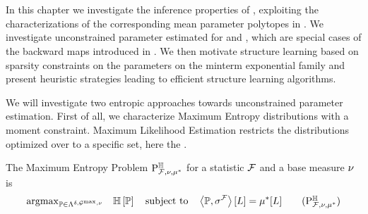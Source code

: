 \chapter{\chatextnetworkReasoning}\label{cha:networkReasoning}

In this chapter we investigate the inference properties of \HybridLogicNetworks{}, exploiting the characterizations of the corresponding mean parameter polytopes in .
We investigate unconstrained parameter estimated for \MarkovLogicNetworks{} and \HybridLogicNetworks{}, which are special cases of the backward maps introduced in .
We then motivate structure learning based on sparsity constraints on the parameters on the minterm exponential family and present heuristic strategies leading to efficient structure learning algorithms.



 \label{sec:parameterEstimation} %

We will investigate two entropic approaches towards unconstrained parameter estimation.
First of all, we characterize Maximum Entropy distributions with a moment constraint.
Maximum Likelihood Estimation restricts the distributions optimized over to a specific set, here the \HybridLogicNetworks{}.



The Maximum Entropy Problem $\mathrm{P}^{\mathbb{H}}_{\mathcal{F},\nu,\mu^*}$ for a statistic $\mathcal{F}$ and a base measure $\nu$ is %
\begin{align}\label{prob:maxEntropyHLN}
    \argmax_{\probtensor\in\bmrealprobof{\basemeasure}} \quad \sentropyof{\probtensor}
    \quad \text{subject to} \quad
    \contractionof{\probtensor,\sencmlnstat}{\selvariable}
    =  \genmeanwith
    \tag{$\probtagtypeinst{\entropysymbol}{\mlnstat,\basemeasure,\genmean}$}
\end{align}

